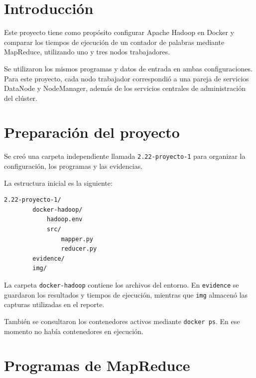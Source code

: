

\section{Introducción}

Este proyecto tiene como propósito configurar Apache Hadoop en Docker 
y comparar los tiempos de ejecución de un contador de palabras mediante 
MapReduce, utilizando uno y tres nodos trabajadores.

Se utilizaron los mismos programas y datos de entrada en ambas configuraciones. 
Para este proyecto, cada nodo trabajador correspondió a una pareja de servicios DataNode 
y NodeManager, además de los servicios centrales de administración del clúster.

\section{Preparación del proyecto}
Se creó una carpeta independiente llamada \texttt{2.22-proyecto-1} para organizar la 
configuración, los programas y las evidencias. 

La estructura inicial es la siguiente: 

\begin{lstlisting}[language={}]
    2.22-proyecto-1/
        docker-hadoop/
            hadoop.env
            src/
                mapper.py
                reducer.py
        evidence/
        img/
\end{lstlisting}

La carpeta \texttt{docker-hadoop} contiene los archivos del 
entorno. En \texttt{evidence} se guardaron los resultados y tiempos 
de ejecución, mientras que \texttt{img} almacenó las capturas utilizadas en el reporte. 

También se consultaron los contenedores activos mediante \texttt{docker ps}. En ese momento no había contenedores 
en ejecución.

\section{Programas de MapReduce}

